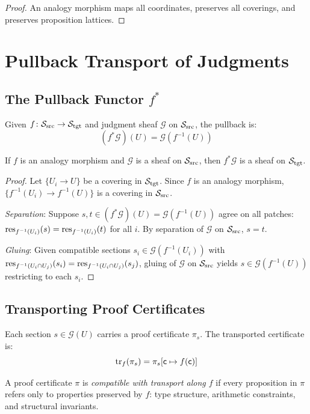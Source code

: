 \documentclass[11pt]{article}
\newcommand{\SourceSite}{\Site_{\mathrm{src}}}
\newcommand{\TargetSite}{\Site_{\mathrm{tgt}}}
\newcommand{\TransportMap}{\mathrm{tr}}
\newcommand{\ProofCert}{\pi}
\begin{document}
\begin{proof}
An analogy morphism maps all coordinates, preserves all coverings,
and preserves proposition lattices.
\end{proof}

\section{Pullback Transport of Judgments}\label{sec:pullback}

\subsection{The Pullback Functor $f^{*}$}
Given $f \colon \SourceSite \to \TargetSite$ and judgment sheaf
$\mathcal{G}$ on $\SourceSite$, the pullback is:
\[
  (f^{*}\mathcal{G})(U) = \mathcal{G}(f^{-1}(U))
\]

\begin{theorem}\label{thm:pullback-sheaf}
If $f$ is an analogy morphism and $\mathcal{G}$ is a sheaf on
$\SourceSite$, then $f^{*}\mathcal{G}$ is a sheaf on $\TargetSite$.
\end{theorem}

\begin{proof}
Let $\{U_i \to U\}$ be a covering in $\TargetSite$.  Since $f$ is an
analogy morphism, $\{f^{-1}(U_i) \to f^{-1}(U)\}$ is a covering in
$\SourceSite$.

\emph{Separation}: Suppose $s, t \in (f^{*}\mathcal{G})(U) =
\mathcal{G}(f^{-1}(U))$ agree on all patches:
$\mathrm{res}_{f^{-1}(U_i)}(s) = \mathrm{res}_{f^{-1}(U_i)}(t)$ for all $i$.
By separation of $\mathcal{G}$ on $\SourceSite$, $s = t$.

\emph{Gluing}: Given compatible sections $s_i \in
\mathcal{G}(f^{-1}(U_i))$ with
$\mathrm{res}_{f^{-1}(U_i \cap U_j)}(s_i) = \mathrm{res}_{f^{-1}(U_i \cap U_j)}(s_j)$,
gluing of $\mathcal{G}$ on $\SourceSite$ yields
$s \in \mathcal{G}(f^{-1}(U))$ restricting to each $s_i$.
\end{proof}

\subsection{Transporting Proof Certificates}
Each section $s \in \mathcal{G}(U)$ carries a proof certificate
$\ProofCert_s$.  The transported certificate is:
\[
  \TransportMap_f(\ProofCert_s) = \ProofCert_s[\coord \mapsto f(\coord)]
\]

\begin{definition}\label{def:cert-compat}
A proof certificate $\ProofCert$ is \emph{compatible with transport
along $f$} if every proposition in $\ProofCert$ refers only to
properties preserved by $f$: type structure, arithmetic constraints,
and structural invariants.
\end{definition}
\end{document}
